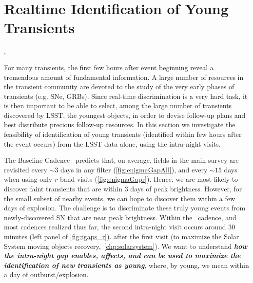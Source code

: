 
%
%
%
%
%
%
%
%

\section{Realtime Identification of Young Transients}
\def\secname{\chpname:transientsAge}\label{sec:\secname}


,  %

For many transients, the first few hours after event beginning reveal a tremendous amount of fundamental information. A large number of resources in the transient community are devoted to the study of the very early phases of transients (e.g. SNe, GRBs). Since real-time discrimination is a very hard task, it is then important to be able to select, among the large number of transients discovered by LSST, the youngest objects, in order to devise follow-up plans and best distribute precious follow-up resources. In this section we investigate the feasibility of identification of young transients (identified within few hours after the event occurs) from the LSST data alone, using the intra-night visits.

The Baseline Cadence~ predicts that, on average,
fields in the main survey are revisited every $\sim3$ days in any filter
(\autoref{fig:enigmaGapAll}), and every $\sim15$ days when using only
$r$ band visits (\autoref{fig:enigmaGapr}).  Hence, we are most likely
to discover faint transients that are within 3 days of peak brightness.
However, for the small subset of nearby events, we can hope to discover
them within a few days of explosion.  The challenge is to discriminate
these truly young events from newly-discovered SN that are near peak
brightness.
Within the~ cadence, and most cadences
realized thus far, the second intra-night visit occurs around 30 minutes (left panel of \autoref{fig:tgaps_r}).
after the first visit (to maximize the Solar System moving objects recovery,~\autoref{chp:solarsystem}). We want to understand {\bf\emph{how the intra-night gap enables, affects, and can be used to maximize the identification of new transients as young}}, where, by young, we mean within a day of outburst/explosion.

